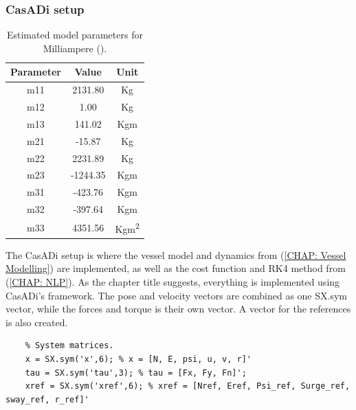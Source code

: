 \subsubsection*{CasADi setup}
\begin{table}[ht!]
    \begin{center}
        \caption{Estimated model parameters for Milliampere (\cite{pedersen2019optimization}).}
        \label{TAB: Model parameter values}
        \begin{tabular}{c|c|c}
            \hline
            \textbf{Parameter} & \textbf{Value} & \textbf{Unit}\\
            \hline
            m11 & 2131.80 & Kg\\
            m12 & 1.00    & Kg \\
            m13 & 141.02  & Kgm\\
            m21 & -15.87  & Kg\\
            m22 & 2231.89 & Kg\\
            m23 & -1244.35 & Kgm\\
            m31 & -423.76 & Kgm\\
            m32 & -397.64 & Kgm\\
            m33 & 4351.56 & Kgm\textsuperscript{2}\\
        \end{tabular}
    \end{center}
\end{table}

The CasADi setup is where the vessel model and dynamics from (\ref{CHAP: Vessel Modelling}) are implemented, as well as the cost function and \gls{RK4}
method from (\ref{CHAP: NLP}). As the chapter title suggests, everything is implemented using CasADi's framework. The pose and velocity vectors
are combined as one SX.sym vector, while the forces and torque is their own vector. A vector for the references is also created.
\begin{lstlisting}
    % System matrices.
    x = SX.sym('x',6); % x = [N, E, psi, u, v, r]'
    tau = SX.sym('tau',3); % tau = [Fx, Fy, Fn]';
    xref = SX.sym('xref',6); % xref = [Nref, Eref, Psi_ref, Surge_ref, sway_ref, r_ref]'
\end{lstlisting}

